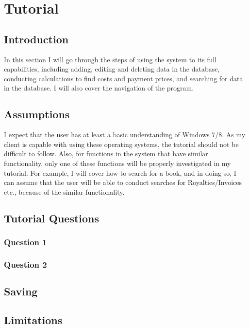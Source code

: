 \section{Tutorial}

\subsection{Introduction}

In this section I will go through the steps of using the system to its full capabilities, including adding, editing and deleting data in the database, conducting calculations to find costs and payment prices, and searching for data in the database. I will also cover the navigation of the program.

\subsection{Assumptions}

I expect that the user has at least a basic understanding of Windows 7/8. As my client is capable with using these operating systems, the tutorial should not be difficult to follow. Also, for functions in the system that have similar functionality, only one of these functions will be properly investigated in my tutorial. For example, I will cover how to search for a book, and in doing so, I can assume that the user will be able to conduct searches for Royalties/Invoices etc., because of the similar functionality.

\subsection{Tutorial Questions}

\subsubsection{Question 1}

\subsubsection{Question 2}

\subsection{Saving}

\subsection{Limitations}

